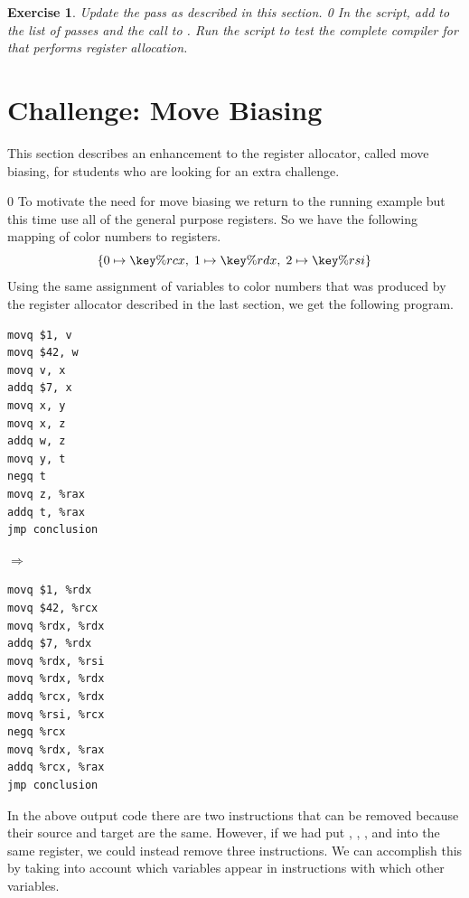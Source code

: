 \documentclass[7x10]{TimesAPriori_MIT}%
\def\racketEd{0}
\def\edition{1}
\newcommand{\racket}[1]{{\if\edition\racketEd{#1}\fi}}
\newtheorem{exercise}[theorem]{Exercise}
\begin{document}
\begin{exercise}\normalfont
Update the  pass as described in this section.
%
\racket{
In the  script, add \code{prelude\_and\_conclusion} to the
list of passes and the call to \code{compiler-tests}.}
%
Run the script to test the complete compiler for \LangVar{} that
performs register allocation.
\end{exercise}

\section{Challenge: Move Biasing}
\label{sec:move-biasing}

This section describes an enhancement to the register allocator,
called move biasing, for students who are looking for an extra
challenge.

{\if\edition\racketEd      
To motivate the need for move biasing we return to the running example
but this time use all of the general purpose registers.  So we have
the following mapping of color numbers to registers.
\[
  \{ 0 \mapsto \key{\%rcx}, \; 1 \mapsto \key{\%rdx}, \; 2 \mapsto \key{\%rsi} \}
\]
Using the same assignment of variables to color numbers that was
produced by the register allocator described in the last section, we
get the following program.
\begin{center}
\begin{minipage}{0.3\textwidth}
\begin{lstlisting}
movq $1, v
movq $42, w
movq v, x
addq $7, x
movq x, y
movq x, z
addq w, z
movq y, t
negq t
movq z, %rax
addq t, %rax
jmp conclusion
\end{lstlisting}
\end{minipage}
$\Rightarrow\qquad$
\begin{minipage}{0.45\textwidth}
\begin{lstlisting}
movq $1, %rdx
movq $42, %rcx
movq %rdx, %rdx
addq $7, %rdx
movq %rdx, %rsi
movq %rdx, %rdx
addq %rcx, %rdx
movq %rsi, %rcx
negq %rcx
movq %rdx, %rax
addq %rcx, %rax
jmp conclusion
\end{lstlisting}
\end{minipage}
\end{center}
In the above output code there are two  instructions that
can be removed because their source and target are the same.  However,
if we had put , , , and  into the same
register, we could instead remove three  instructions.  We
can accomplish this by taking into account which variables appear in
 instructions with which other variables.
\fi}
\end{document}

